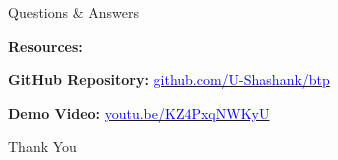 \documentclass[10pt]{beamer}
\begin{document}
\begin{frame}
\begin{center}
\Huge Questions \& Answers

\vspace{1cm}

\normalsize
\textbf{Resources:}

\vspace{0.3cm}

\textbf{GitHub Repository:} \href{https://github.com/U-Shashank/btp}{\textcolor{blue}{github.com/U-Shashank/btp}}

\textbf{Demo Video:} \href{https://youtu.be/KZ4PxqNWKyU}{\textcolor{blue}{youtu.be/KZ4PxqNWKyU}}

\vspace{1cm}

\Large Thank You
\end{center}
\end{frame}
\end{document}
